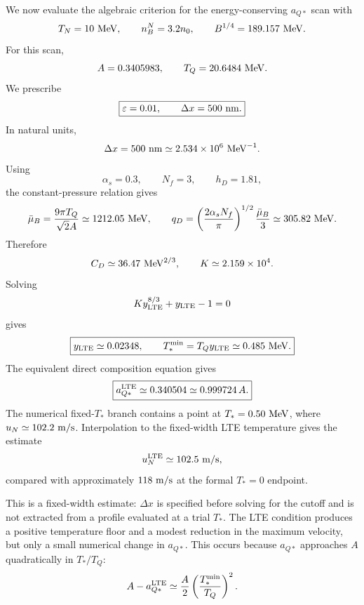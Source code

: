 We now evaluate the algebraic criterion for the energy-conserving
\(a_{Q*}\) scan with
\begin{equation}
T_N=10\ {\rm MeV},
\qquad
n_B^N=3.2n_0,
\qquad
B^{1/4}=189.157\ {\rm MeV}.
\end{equation}
For this scan,
\begin{equation}
A=0.3405983,
\qquad
T_Q=20.6484\ {\rm MeV}.
\end{equation}
We prescribe
\begin{equation}
\boxed{
\varepsilon=0.01,
\qquad
\Delta x=500\ {\rm nm}.
}
\end{equation}
In natural units,
\begin{equation}
\Delta x
=
500\ {\rm nm}
\simeq
2.534\times10^6\ {\rm MeV}^{-1}.
\end{equation}
Using
\begin{equation}
\alpha_s=0.3,
\qquad
N_f=3,
\qquad
h_D=1.81,
\end{equation}
the constant-pressure relation gives
\begin{equation}
\bar\mu_B
=
\frac{9\pi T_Q}{\sqrt{2}A}
\simeq
1212.05\ {\rm MeV},
\qquad
q_D
=
\left(\frac{2\alpha_sN_f}{\pi}\right)^{1/2}
\frac{\bar\mu_B}{3}
\simeq
305.82\ {\rm MeV}.
\end{equation}
Therefore
\begin{equation}
C_D
\simeq
36.47\ {\rm MeV}^{2/3},
\qquad
K
\simeq
2.159\times10^4.
\end{equation}
Solving
\begin{equation}
K y_{\rm LTE}^{8/3}+y_{\rm LTE}-1=0
\end{equation}
gives
\begin{equation}
\boxed{
y_{\rm LTE}\simeq0.02348,
\qquad
T_*^{\rm min}
=T_Qy_{\rm LTE}
\simeq0.485\ {\rm MeV}.
}
\end{equation}
The equivalent direct composition equation gives
\begin{equation}
\boxed{
a_{Q*}^{\rm LTE}
\simeq0.340504
\simeq0.999724\,A.
}
\end{equation}
The numerical fixed-\(T_*\) branch contains a point at
\(T_*=0.50\ {\rm MeV}\), where \(u_N\simeq102.2\ {\rm m/s}\).  Interpolation
to the fixed-width LTE temperature gives the estimate
\begin{equation}
u_N^{\rm LTE}\simeq102.5\ {\rm m/s},
\end{equation}
compared with approximately \(118\ {\rm m/s}\) at the formal
\(T_*=0\) endpoint.

This is a fixed-width estimate: \(\Delta x\) is specified before solving for
the cutoff and is not extracted from a profile evaluated at a trial \(T_*\).
The LTE condition produces a positive temperature floor and a modest reduction
in the maximum velocity, but only a small numerical change in \(a_{Q*}\).
This occurs because
\(a_{Q*}\) approaches \(A\) quadratically in \(T_*/T_Q\):
\begin{equation}
A-a_{Q*}^{\rm LTE}
\simeq
\frac{A}{2}
\left(\frac{T_*^{\rm min}}{T_Q}\right)^2.
\end{equation}

